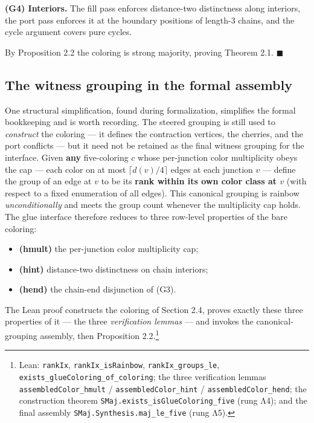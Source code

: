\documentclass[11pt]{article}
\theoremstyle{definition}
\theoremstyle{remark}
\providecommand{\tightlist}{\setlength{\itemsep}{0pt}\setlength{\parskip}{0pt}}
\begin{document}
\textbf{(G4) Interiors.} The fill pass enforces distance-two distinctness along interiors, the port pass enforces it at the boundary positions of length-3 chains, and the cycle argument covers pure cycles.

By Proposition 2.2 the coloring is strong majority, proving Theorem 2.1. \(\blacksquare\)

\subsection{The witness grouping in the formal assembly}\label{26-the-witness-grouping-in-the-formal-assembly}

One structural simplification, found during formalization, simplifies the formal bookkeeping and is worth recording. The steered grouping is still used to \emph{construct} the coloring --- it defines the contraction vertices, the cherries, and the port conflicts --- but it need not be retained as the final witness grouping for the interface. Given \textbf{any} five-coloring \(c\) whose per-junction color multiplicity obeys the cap --- each color on at most \(\lceil d(v)/4 \rceil\) edges at each junction \(v\) --- define the group of an edge at \(v\) to be its \textbf{rank within its own color class at \(v\)} (with respect to a fixed enumeration of all edges). This canonical grouping is rainbow \emph{unconditionally} and meets the group count whenever the multiplicity cap holds. The glue interface therefore reduces to three row-level properties of the bare coloring:

\begin{itemize}
\tightlist
\item
  \textbf{(hmult)} the per-junction color multiplicity cap;
\item
  \textbf{(hint)} distance-two distinctness on chain interiors;
\item
  \textbf{(hend)} the chain-end disjunction of (G3).
\end{itemize}

The Lean proof constructs the coloring of Section 2.4, proves exactly these three properties of it --- the three \emph{verification lemmas} --- and invokes the canonical-grouping assembly, then Proposition 2.2.\footnote{Lean: \texttt{rankIx}, \texttt{rankIx\_isRainbow}, \texttt{rankIx\_groups\_le}, \texttt{exists\_glueColoring\_of\_coloring}; the three verification lemmas \texttt{assembledColor\_hmult} / \texttt{assembledColor\_hint} / \texttt{assembledColor\_hend}; the construction theorem \texttt{SMaj.exists\_isGlueColoring\_five} (rung Λ4); and the final assembly \texttt{SMaj.Synthesis.maj\_le\_five} (rung Λ5).}
\end{document}
